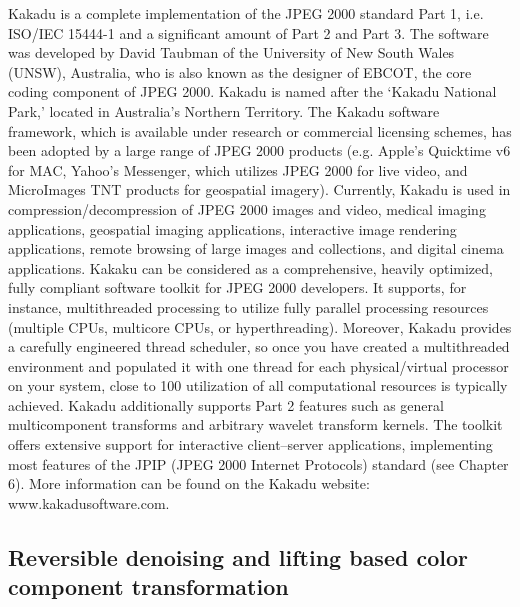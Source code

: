 Kakadu is a complete implementation of the JPEG 2000 standard Part 1, i.e. ISO/IEC
15444-1 and a significant amount of Part 2 and Part 3. The software was developed by
David Taubman of the University of New South Wales (UNSW), Australia, who is also
known as the designer of EBCOT, the core coding component of JPEG 2000. Kakadu is
named after the ‘Kakadu National Park,’ located in Australia’s Northern Territory.
The Kakadu software framework, which is available under research or commercial
licensing schemes, has been adopted by a large range of JPEG 2000 products (e.g. Apple’s
Quicktime v6 for MAC, Yahoo’s Messenger, which utilizes JPEG 2000 for live video,
and MicroImages TNT products for geospatial imagery).
Currently, Kakadu is used in compression/decompression of JPEG 2000 images and
video, medical imaging applications, geospatial imaging applications, interactive image
rendering applications, remote browsing of large images and collections, and digital cinema
applications. Kakaku can be considered as a comprehensive, heavily optimized,
fully compliant software toolkit for JPEG 2000 developers. It supports, for instance,
multithreaded processing to utilize fully parallel processing resources (multiple CPUs,
multicore CPUs, or hyperthreading). Moreover, Kakadu provides a carefully engineered
thread scheduler, so once you have created a multithreaded environment and populated
it with one thread for each physical/virtual processor on your system, close to 100%
utilization of all computational resources is typically achieved.
Kakadu additionally supports Part 2 features such as general multicomponent transforms
and arbitrary wavelet transform kernels. The toolkit offers extensive support for
interactive client–server applications, implementing most features of the JPIP (JPEG
2000 Internet Protocols) standard (see Chapter 6). More information can be found on the
Kakadu website: www.kakadusoftware.com. \cite{jpeg_suite}

\subsection{Reversible denoising and lifting based color component transformation}

